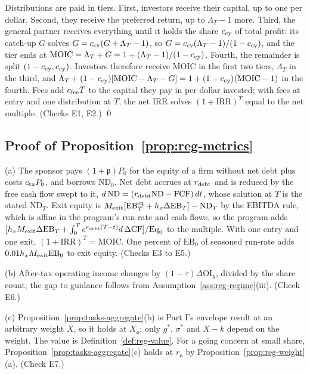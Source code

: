 Distributions are paid in tiers. First, investors receive their capital, up to one per dollar. Second, they receive the preferred return, up to $\Lambda_T-1$ more. Third, the general partner receives everything until it holds the share $c_{\rm cy}$ of total profit: its catch-up $G$ solves $G=c_{\rm cy}(G+\Lambda_T-1)$, so $G=c_{\rm cy}(\Lambda_T-1)/(1-c_{\rm cy})$, and the tier ends at $\mathrm{MOIC}=\Lambda_T+G=1+(\Lambda_T-1)/(1-c_{\rm cy})$. Fourth, the remainder is split $(1-c_{\rm cy},c_{\rm cy})$. Investors therefore receive $\mathrm{MOIC}$ in the first two tiers, $\Lambda_T$ in the third, and $\Lambda_T+(1-c_{\rm cy})[\mathrm{MOIC}-\Lambda_T-G]=1+(1-c_{\rm cy})(\mathrm{MOIC}-1)$ in the fourth. Fees add $c_{\rm fee}T$ to the capital they pay in per dollar invested; with fees at entry and one distribution at $T$, the net IRR solves $(1+\mathrm{IRR})^T$ equal to the net multiple. (Checks E1, E2.) \qed

\subsection*{Proof of Proposition~\ref{prop:reg-metrics}}

(a) The sponsor pays $(1+\mathfrak p)P_0$ for the equity of a firm without net debt plus costs $c_{\rm tx}P_0$, and borrows $\mathrm{ND}_0$. Net debt accrues at $r_{\rm debt}$ and is reduced by the free cash flow swept to it, $d\,\mathrm{ND}=(r_{\rm debt}\mathrm{ND}-\mathrm{FCF})\,dt$, whose solution at $T$ is the stated $\mathrm{ND}_T$. Exit equity is $M_{\rm exit}[\mathrm{EB}^{\rm sq}_T+h_x\Delta\mathrm{EB}_T]-\mathrm{ND}_T$ by the EBITDA rule, which is affine in the program's run-rate and cash flows, so the program adds $[h_xM_{\rm exit}\Delta\mathrm{EB}_T+\int_0^Te^{r_{\rm debt}(T-t)}d\,\Delta\mathrm{CF}]/\mathrm{Eq}_0$ to the multiple. With one entry and one exit, $(1+\mathrm{IRR})^T=\mathrm{MOIC}$. One percent of $\mathrm{EB}_0$ of seasoned run-rate adds $0.01h_xM_{\rm exit}\mathrm{EB}_0$ to exit equity. (Checks E3 to E5.)

(b) After-tax operating income changes by $(1-\tau)\Delta\mathrm{OI}_y$, divided by the share count; the gap to guidance follows from Assumption~\ref{ass:reg-regime}(iii). (Check E6.)

(c) Proposition~\ref{prop:tasks-aggregate}(b) is Part I's envelope result at an arbitrary weight $X$, so it holds at $X_{\mathsf o}$; only $g^*$, $\sigma^*$ and $X-k$ depend on the weight. The value is Definition~\ref{def:reg-value}. For a going concern at small share, Proposition~\ref{prop:tasks-aggregate}(c) holds at $r_{\mathsf o}$ by Proposition~\ref{prop:reg-weight}(a). (Check E7.)

